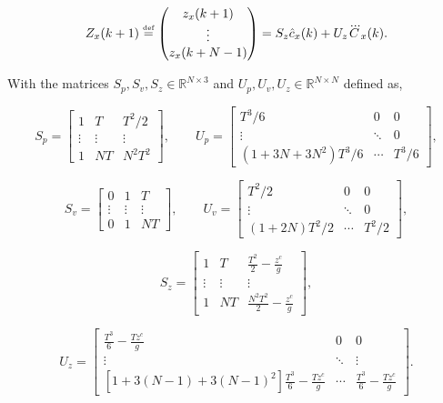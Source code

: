 \begin{equation}
 \label{Eq:PosZMPHorizon}
 { Z}_x(k+1) \stackrel{\mbox{\tiny def}}{=}  \left(
 \begin{matrix}
  {z}_x(k+1) \\
  \vdots \\
  {z}_x(k+N-1)
 \end{matrix}
 \right) = { S}_z \hat{c}_x(k) + { U}_z \dddot{ C}_x(k).
\end{equation} 

With the matrices $S_p, S_v, S_z \in \mathbb{R}^{N\times3}$ and $U_p, U_v , U_z \in \mathbb{R}^{N \times N}$ defined as,

\begin{equation*}
  S_{p}=\begin{bmatrix} 1 & T & T^2/2 \\ \vdots & \vdots & \vdots \\ 1 & NT & N^2T^2 \end{bmatrix}, \qquad
  U_{p}=\begin{bmatrix} T^3/6 & 0 & 0 \\ \vdots & \ddots & 0 \\ (1+3N+3N^2)T^3/6 & \cdots & T^3/6 \end{bmatrix},
\end{equation*}

\begin{equation*}
  S_{v}=\begin{bmatrix} 0 & 1 & T \\ \vdots & \vdots & \vdots \\ 0 & 1 & NT \end{bmatrix}, \qquad
  U_{v}=\begin{bmatrix} T^2/2 & 0 & 0 \\ \vdots & \ddots & 0 \\ (1+2N)T^2/2 & \cdots & T^2/2 \end{bmatrix},
\end{equation*}

\begin{equation*}
  S_{z} = \begin{bmatrix} 1 & T & \frac{T^2}2-\frac{z^{c}}{g} \\ \vdots & \vdots & \vdots \\
                          1 & NT & \frac{N^2T^2}{2}-\frac{z^{c}}{g} \end{bmatrix},
\end{equation*}

\begin{equation*}
  U_{z} = \begin{bmatrix}
            \frac{T^3}{6}-\frac{Tz^{c}}{g} & 0 & 0 \\
          \vdots & \ddots & \vdots \\
          [1+3(N-1)+3(N-1)^2]\frac{T^3}{6}-\frac{Tz^{c}}{g} & \cdots & \frac{T^3}{6}-\frac{Tz^{c}}{g}
          \end{bmatrix}.
\end{equation*}

